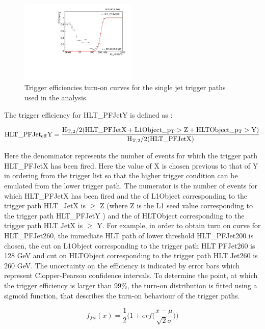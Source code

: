 \begin{figure}[!htbp]
\begin{center}
    \includegraphics[width=0.5\textwidth]{Plots_HT_2_150/Fit_Turn_Efficiency_320_2_ht_2.pdf}%
    \caption{Trigger efficiencies turn-on curves for the single jet trigger paths used in the analysis.}
    \label{fig:trig_eff}
  \end{center}
\end{figure} 

The trigger efficiency for HLT\_PFJetY is defined as : 

\begin{equation}
  \rm{HLT\_PFJet_{eff}Y = \frac{\httwo (HLT\_PFJetX + L1Object\_\pt > Z + HLTObject\_\pt > Y)}{\httwo (HLT\_PFJetX)}}
\end{equation}

Here the denominator represents the number of events for which the trigger path HLT\_PFJetX has been fired. Here the value of X is chosen 
previous to that of Y in \pt ordering from the trigger list so that the higher trigger condition can be emulated from the lower trigger 
path. The numerator is the number of events for which HLT\_PFJetX has been fired and the \pt of L1Object corresponding to the trigger path 
HLT\_JetX is $\geq$ Z (where Z is the L1 seed value corresponding to the trigger path
HLT\_PFJetY ) and the \pt of HLTObject corresponding to the trigger path HLT JetX is $\geq$ Y. For example, in order to obtain turn on 
curve for HLT\_PFJet260, the immediate HLT path of lower threshold HLT\_PFJet200 is chosen, the \pt cut on L1Object corresponding to the 
trigger path HLT PFJet260 is 128 GeV and \pt cut on HLTObject corresponding to the trigger path
HLT Jet260 is 260 GeV. 
The uncertainty on the efficiency is indicated by error bars which represent Clopper-Pearson confidence intervals.
To determine the point, at which the trigger efficiency is larger than 99\%, the turn-on distribution is fitted using a sigmoid function, 
that describes the turn-on behaviour of the trigger paths.

\begin{equation}
  f_{fit} (x) = \frac {1}{2} \Big( 1 ~\texttt{+}~ erf \Big(\frac {x - \mu}{\sqrt{2} \sigma} \Big) \Big)
\end{equation}

